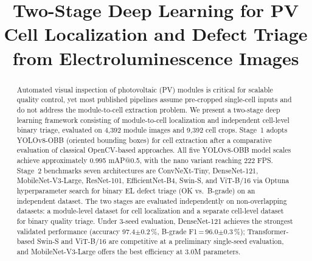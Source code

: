 \documentclass[conference]{IEEEtran}
\begin{document}
\title{Two-Stage Deep Learning for PV Cell Localization and Defect Triage from Electroluminescence Images%
}


\maketitle

\begin{abstract}
Automated visual inspection of photovoltaic (PV) modules is critical for scalable quality control, yet most published pipelines assume pre-cropped single-cell inputs and do not address the module-to-cell extraction problem. We present a two-stage deep learning framework consisting of module-to-cell localization and independent cell-level binary triage, evaluated on 4{,}392 module images and 9{,}392 cell crops. Stage~1 adopts YOLOv8-OBB (oriented bounding boxes) for cell extraction after a comparative evaluation of classical OpenCV-based approaches. All five YOLOv8-OBB model scales achieve approximately 0.995 mAP@0.5, with the nano variant reaching 222 FPS. Stage~2 benchmarks seven architectures are ConvNeXt-Tiny, DenseNet-121, MobileNet-V3-Large, ResNet-101, EfficientNet-B4, Swin-S, and ViT-B/16 via Optuna hyperparameter search for binary EL defect triage (OK vs.\ B-grade) on an independent dataset. The two stages are evaluated independently on non-overlapping datasets: a module-level dataset for cell localization and a separate cell-level dataset for binary quality triage. Under 3-seed evaluation, DenseNet-121 achieves the strongest validated performance (accuracy 97.4$\pm$0.2\,\%, B-grade F1\,=\,96.0$\pm$0.3\,\%); Transformer-based Swin-S and ViT-B/16 are competitive at a preliminary single-seed evaluation, and MobileNet-V3-Large offers the best efficiency at 3.0M parameters.
\end{abstract}
\end{document}
